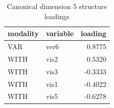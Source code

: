 \begin{table}
\caption{Canonical dimension 5 structure loadings}
\label{tab:cca_dimension_5_loadings}
\begin{tabular}{llr}
\toprule
modality & variable & loading \\
\midrule
VAR & ver6 & 0.8775 \\
WITH & vis2 & 0.5320 \\
WITH & vis3 & -0.3333 \\
WITH & vis1 & -0.4022 \\
WITH & vis5 & -0.6278 \\
\bottomrule
\end{tabular}
\end{table}
